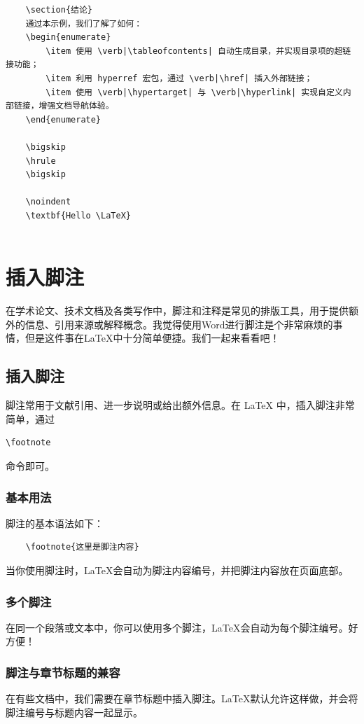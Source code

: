 \begin{lstlisting}
	\section{结论}
	通过本示例，我们了解了如何：
	\begin{enumerate}
		\item 使用 \verb|\tableofcontents| 自动生成目录，并实现目录项的超链接功能；
		\item 利用 hyperref 宏包，通过 \verb|\href| 插入外部链接；
		\item 使用 \verb|\hypertarget| 与 \verb|\hyperlink| 实现自定义内部链接，增强文档导航体验。
	\end{enumerate}
	
	\bigskip
	\hrule
	\bigskip
	
	\noindent
	\textbf{Hello \LaTeX}
	

\end{lstlisting}



\section{ 插入脚注}
在学术论文、技术文档及各类写作中，脚注和注释是常见的排版工具，用于提供额外的信息、引用来源或解释概念。我觉得使用Word进行脚注是个非常麻烦的事情，但是这件事在\LaTeX 中十分简单便捷。我们一起来看看吧！

\subsection{插入脚注}
脚注常用于文献引用、进一步说明或给出额外信息。在 LaTeX 中，插入脚注非常简单，通过 \begin{lstlisting}
\footnote\end{lstlisting} 命令即可。
\subsubsection{基本用法}
脚注的基本语法如下：
\begin{lstlisting}
	\footnote{这里是脚注内容}
\end{lstlisting}
当你使用脚注时，\LaTeX 会自动为脚注内容编号，并把脚注内容放在页面底部。

\subsubsection{多个脚注}
在同一个段落或文本中，你可以使用多个脚注，\LaTeX 会自动为每个脚注编号。好方便！

\subsubsection{脚注与章节标题的兼容}
在有些文档中，我们需要在章节标题中插入脚注。\LaTeX 默认允许这样做，并会将脚注编号与标题内容一起显示。



